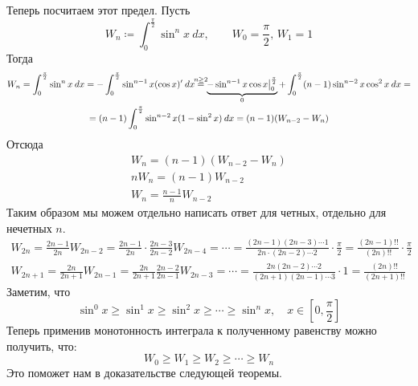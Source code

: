 Теперь посчитаем этот предел. Пусть
\begin{equation*}
  W_n \coloneqq \int_{0}^{\frac{\pi}{2}} \sin^n x \: dx, \qquad W_0 = \frac{\pi}{2},\, W_1 = 1
\end{equation*}
Тогда
\begin{equation*}
  \begin{gathered}
    W_n = \int_{0}^{\frac{\pi}{2}} \sin^n x \: dx =
    -\int_{0}^{\frac{\pi}{2}} \sin^{n - 1}x (\cos x)' \: dx
    \overset{\mathclap{n \geq 2}}{=}
    \underbrace{-\sin^{n - 1}x \cos x \big|_{0}^{\frac{\pi}{2}}}_{\mathclap{0}} +
    \int_{0}^{\frac{\pi}{2}}(n - 1)\sin^{n - 2}x \cos^2 x \: dx
    = \\ =
    (n - 1)\int_{0}^{\frac{\pi}{2}} \sin^{n - 2} x (1 - \sin^2 x) \: dx =
    (n -1 )(W_{n - 2} - W_n)
    \end{gathered}
\end{equation*}
Отсюда
\begin{equation*}
    \begin{gathered}
        W_n = (n - 1)(W_{n - 2} - W_n) \\
        nW_n  = (n - 1)W_{n - 2} \\
        W_n = \frac{n - 1}{n} W_{n - 2}
    \end{gathered}
\end{equation*}
Таким образом мы можем отдельно написать ответ для четных, отдельно для нечетных $n$.
\begin{equation*}
  \begin{gathered}
    W_{2n} =
    \frac{2n - 1}{2n}W_{2n - 2} =
    \frac{2n - 1}{2n}\cdot\frac{2n - 3}{2n - 2}W_{2n - 4}
    = \dotsb =
    \frac{(2n - 1)(2n - 3) \dotsm 1}{2n \cdot (2n - 2) \dotsm 2} \cdot \frac{\pi}{2} =
    \frac{(2n - 1)!!}{(2n)!!} \cdot \frac{\pi}{2}
    \\
    W_{2n + 1} =
    \frac{2n}{2n + 1} W_{2n - 1} =
    \frac{2n}{2n + 1}\frac{2n - 2}{2n - 1}W_{2n - 3}
    = \dotsb =
    \frac{2n(2n - 2)\dotsm 2}{(2n + 1)(2n - 1)\dotsm 3}\cdot 1 =
    \frac{(2n)!!}{(2n + 1)!!}
  \end{gathered}
\end{equation*}
Заметим, что
\begin{equation*}
    \sin^{0} x \geq \sin^{1} x \geq \sin^2 x \geq \dotsb \geq \sin^n x, \quad x \in [0, \frac{\pi}{2}]
\end{equation*}
Теперь применив монотонность интеграла к полученному равенству можно получить, что:
\begin{equation*}
    W_0 \geq W_1 \geq W_2 \geq \dotsb \geq W_n
\end{equation*}
Это поможет нам в доказательстве следующей теоремы.

